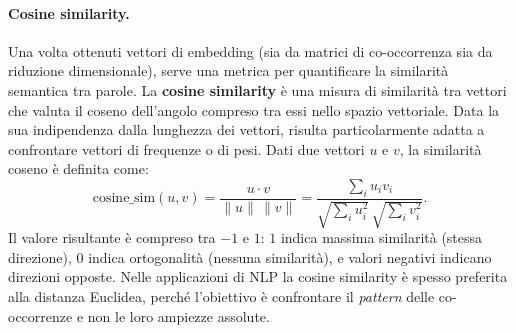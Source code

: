 \paragraph{Cosine similarity.}
Una volta ottenuti vettori di embedding (sia da matrici di co-occorrenza sia da riduzione dimensionale), serve una metrica per quantificare la similarità semantica tra parole. La \textbf{cosine similarity} è una misura di similarità tra vettori che valuta il coseno dell'angolo compreso tra essi nello spazio vettoriale. Data la sua indipendenza dalla lunghezza dei vettori, risulta particolarmente adatta a confrontare vettori di frequenze o di pesi.
Dati due vettori $u$ e $v$, la similarità coseno è definita come:
\begin{equation}
\text{cosine\_sim}(u, v) = 
\frac{u \cdot v}{\|u\| \, \|v\|}
= \frac{\sum_i u_i v_i}{\sqrt{\sum_i u_i^2} \, \sqrt{\sum_i v_i^2}}.
\end{equation}
Il valore risultante è compreso tra $-1$ e $1$: $1$ indica massima similarità (stessa direzione), $0$ indica ortogonalità (nessuna similarità), e valori negativi indicano direzioni opposte. Nelle applicazioni di NLP la cosine similarity è spesso preferita alla distanza Euclidea, perché l'obiettivo è confrontare il \textit{pattern} delle co-occorrenze e non le loro ampiezze assolute.
